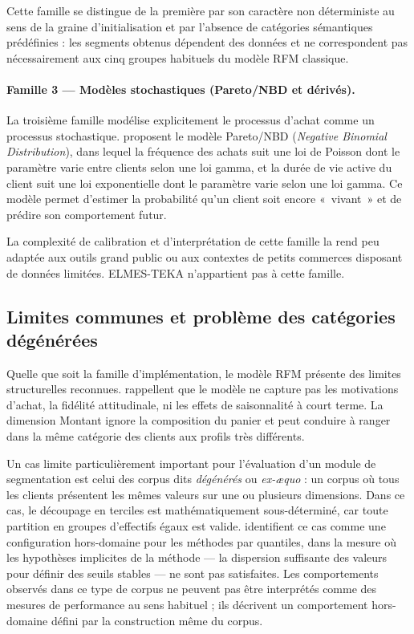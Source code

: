 Cette famille se distingue de la première par son caractère non déterministe au sens de
la graine d'initialisation et par l'absence de catégories sémantiques prédéfinies : les
segments obtenus dépendent des données et ne correspondent pas nécessairement aux cinq
groupes habituels du modèle RFM classique.

\paragraph{Famille 3 — Modèles stochastiques (Pareto/NBD et dérivés).}
La troisième famille modélise explicitement le processus d'achat comme un processus
stochastique. \citet{Fader2005} proposent le modèle Pareto/NBD (\emph{Negative Binomial
Distribution}), dans lequel la fréquence des achats suit une loi de Poisson dont le paramètre
varie entre clients selon une loi gamma, et la durée de vie active du client suit une loi
exponentielle dont le paramètre varie selon une loi gamma. Ce modèle permet d'estimer la
probabilité qu'un client soit encore «~vivant~» et de prédire son comportement futur.

La complexité de calibration et d'interprétation de cette famille la rend peu adaptée aux
outils grand public ou aux contextes de petits commerces disposant de données limitées.
ELMES-TEKA n'appartient pas à cette famille.

\subsection{Limites communes et problème des catégories dégénérées}
\label{subsec:revue-rfm-limites}

Quelle que soit la famille d'implémentation, le modèle RFM présente des limites structurelles
reconnues. \citet{Salminen2023} rappellent que le modèle ne capture pas les motivations
d'achat, la fidélité attitudinale, ni les effets de saisonnalité à court terme. La dimension
Montant ignore la composition du panier et peut conduire à ranger dans la même catégorie
des clients aux profils très différents.

Un cas limite particulièrement important pour l'évaluation d'un module de segmentation est
celui des corpus dits \emph{dégénérés} ou \emph{ex-æquo} : un corpus où tous les clients
présentent les mêmes valeurs sur une ou plusieurs dimensions. Dans ce cas, le découpage en
terciles est mathématiquement sous-déterminé, car toute partition en groupes d'effectifs
égaux est valide. \citet{ViannaFilho2026} identifient ce cas comme une configuration
hors-domaine pour les méthodes par quantiles, dans la mesure où les hypothèses implicites
de la méthode — la dispersion suffisante des valeurs pour définir des seuils stables —
ne sont pas satisfaites. Les comportements observés dans ce type de corpus ne peuvent pas
être interprétés comme des mesures de performance au sens habituel ; ils décrivent un
comportement hors-domaine défini par la construction même du corpus.

